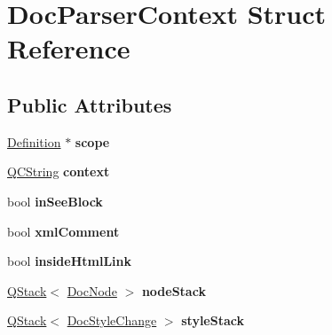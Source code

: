 \hypertarget{struct_doc_parser_context}{}\section{Doc\+Parser\+Context Struct Reference}
\label{struct_doc_parser_context}
\subsection*{Public Attributes}
\begin{DoxyCompactItemize}
\item 
\mbox{\label{struct_doc_parser_context_add383acd336f2e26ecf24c000f31a4e3}} 
\mbox{\hyperlink{class_definition}{Definition}} $\ast$ {\bfseries scope}
\item 
\mbox{\label{struct_doc_parser_context_a440e2d11196fe51c4b5bc991345d866d}} 
\mbox{\hyperlink{class_q_c_string}{Q\+C\+String}} {\bfseries context}
\item 
\mbox{\label{struct_doc_parser_context_a9e9561c7ec0edba0d50cdcb482942bea}} 
bool {\bfseries in\+See\+Block}
\item 
\mbox{\label{struct_doc_parser_context_a5b98ca02af34e324862e5b5b8bbfb207}} 
bool {\bfseries xml\+Comment}
\item 
\mbox{\label{struct_doc_parser_context_a88cb2bde6d7f9ded45c9d33f33b65bb3}} 
bool {\bfseries inside\+Html\+Link}
\item 
\mbox{\label{struct_doc_parser_context_a813c4ba2030c8b34b2c9d8f1ff6020eb}} 
\mbox{\hyperlink{class_q_stack}{Q\+Stack}}$<$ \mbox{\hyperlink{class_doc_node}{Doc\+Node}} $>$ {\bfseries node\+Stack}
\item 
\mbox{\label{struct_doc_parser_context_af6fc30c2dd0edcf5fede2f271316546c}} 
\mbox{\hyperlink{class_q_stack}{Q\+Stack}}$<$ \mbox{\hyperlink{class_doc_style_change}{Doc\+Style\+Change}} $>$ {\bfseries style\+Stack}
\item 
\mbox{\label{struct_doc_parser_context_a27b9c48cc75461a3fcf436c60d6af39a}} 

\end{DoxyCompactItemize}
